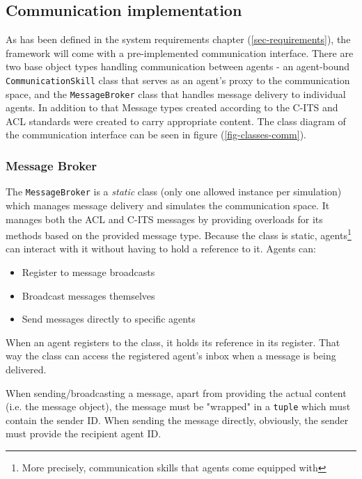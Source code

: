 \documentclass[main.tex]{subfiles}
\begin{document}
\subsection{Communication implementation}

As has been defined in the system requirements chapter (\ref{sec-requirements}), the 
framework will come with a pre-implemented communication interface. There are two 
base object types handling communication between agents - an agent-bound 
\texttt{CommunicationSkill} class that serves as an agent's proxy to the communication 
space, and the \texttt{MessageBroker} class that handles message delivery to individual 
agents. In addition to that Message types created according to the C-ITS and ACL 
standards were created to carry appropriate content. The class diagram of the 
communication interface can be seen in figure (\ref{fig-classes-comm}).

\subsubsection{Message Broker}

The \texttt{MessageBroker} is a \emph{static} class (only one allowed instance per 
simulation) which manages message delivery and simulates the communication space. 
It manages both the ACL and C-ITS messages by providing overloads for its methods 
based on the provided message type. Because the class is static, agents\footnote{More precisely,
communication skills that agents come equipped with} can interact with it without 
having to hold a reference to it. Agents can:

\begin{itemize}
    \item Register to message broadcasts
    \item Broadcast messages themselves 
    \item Send messages directly to specific agents
\end{itemize}

When an agent registers to the class, it holds its reference in its register. 
That way the class can access the registered agent's inbox when a message is 
being delivered.

When sending/broadcasting a message, apart from providing the actual content (i.e. 
the message object), the message must be "wrapped" in a \texttt{tuple} which must 
contain the sender ID. When sending the message directly, obviously, the sender must 
provide the recipient agent ID. 
\end{document}
